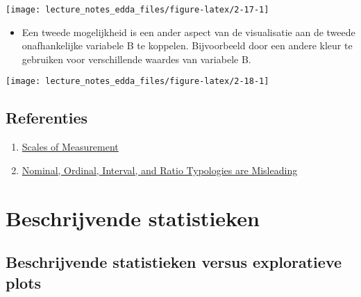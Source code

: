 \documentclass[]{memoir}
\providecommand{\tightlist}{%
  \setlength{\itemsep}{0pt}\setlength{\parskip}{0pt}}
\begin{document}
\texttt{[image: lecture\_notes\_edda\_files/figure-latex/2-17-1]}

\begin{itemize}
\tightlist
\item
  Een tweede mogelijkheid is een ander aspect van de visualisatie aan de tweede onafhankelijke variabele B te koppelen. Bijvoorbeeld door een andere kleur te gebruiken voor verschillende waardes van variabele B.
\end{itemize}

\texttt{[image: lecture\_notes\_edda\_files/figure-latex/2-18-1]}

\hypertarget{referenties-1}{%
\section{Referenties}\label{referenties-1}}

\begin{enumerate}
\def\labelenumi{\arabic{enumi}.}
\tightlist
\item
  \href{http://www.mnestudies.com/research/scales-measurement}{Scales of Measurement}
\item
  \href{http://websites.uwlax.edu/tbrooks/eco307/handouts/velleman\%201993\%20-\%20typologies\%20misleading.pdf}{Nominal, Ordinal, Interval, and Ratio Typologies are Misleading}
\end{enumerate}

\hypertarget{beschrijvende-statistieken}{%
\chapter{Beschrijvende statistieken}\label{beschrijvende-statistieken}}

\hypertarget{beschrijvende-statistieken-versus-exploratieve-plots}{%
\section{Beschrijvende statistieken versus exploratieve plots}\label{beschrijvende-statistieken-versus-exploratieve-plots}}
\end{document}
